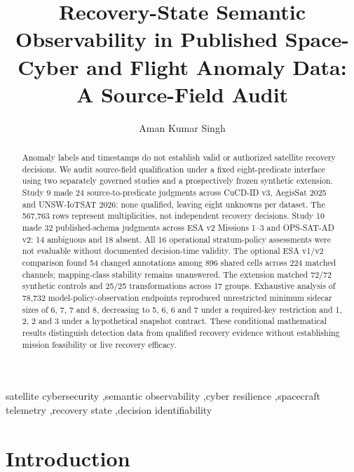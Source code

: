 \documentclass[preprint,12pt]{elsarticle}
\begin{document}
\begin{frontmatter}

\title{Recovery-State Semantic Observability in Published Space-Cyber and Flight Anomaly Data: A Source-Field Audit}

\author[aff1]{Aman Kumar Singh}

\begin{abstract}
Anomaly labels and timestamps do not establish valid or authorized satellite recovery decisions. We audit source-field qualification under a fixed eight-predicate interface using two separately governed studies and a prospectively frozen synthetic extension. Study 9 made 24 source-to-predicate judgments across CuCD-ID v3, AegisSat 2025 and UNSW-IoTSAT 2026: none qualified, leaving eight unknowns per dataset. The 567,763 rows represent multiplicities, not independent recovery decisions. Study 10 made 32 published-schema judgments across ESA v2 Missions 1--3 and OPS-SAT-AD v2: 14 ambiguous and 18 absent. All 16 operational stratum-policy assessments were not evaluable without documented decision-time validity. The optional ESA v1/v2 comparison found 54 changed annotations among 896 shared cells across 224 matched channels; mapping-class stability remains unanswered. The extension matched 72/72 synthetic controls and 25/25 transformations across 17 groups. Exhaustive analysis of 78,732 model-policy-observation endpoints reproduced unrestricted minimum sidecar sizes of 6, 7, 7 and 8, decreasing to 5, 6, 6 and 7 under a required-key restriction and 1, 2, 2 and 3 under a hypothetical snapshot contract. These conditional mathematical results distinguish detection data from qualified recovery evidence without establishing mission feasibility or live recovery efficacy.
\end{abstract}

\begin{keyword}
satellite cybersecurity \sep semantic observability \sep cyber resilience \sep spacecraft telemetry \sep recovery state \sep decision identifiability
\end{keyword}

\end{frontmatter}

\section{Introduction}
\end{document}
